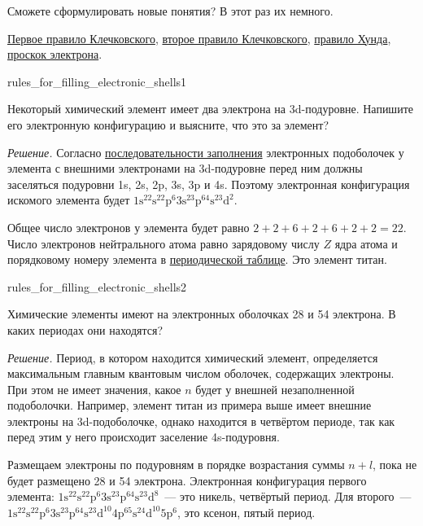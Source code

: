Сможете сформулировать новые понятия? В этот раз их немного.

\begin{termlist}
    \hyperref[term:Klechkovsky_first_rule]{Первое правило Клечковского},
    \hyperref[term:Klechkovsky_second_rule]{второе правило Клечковского},
    \hyperref[term:hund_rule]{правило Хунда},
    \hyperref[term:electron_slip]{проскок электрона}.
\end{termlist}

\begin{example}{}{rules_for_filling_electronic_shells1}
    \begin{condition}
        Некоторый химический элемент имеет два электрона на 3d-подуровне. Напишите его электронную конфигурацию и выясните, что это за элемент?
    \end{condition}

    \medskip

    \textit{Решение.} Согласно \hyperref[eq:sequence_of_filling_electronic_subshells]{последовательности заполнения} электронных подоболочек у элемента с внешними электронами на 3d-подуровне перед ним должны заселяться подуровни 1s, 2s, 2p, 3s, 3p и 4s. Поэтому электронная конфигурация искомого элемента будет $1\mathrm{s}^22\mathrm{s}^22\mathrm{p}^{6}3\mathrm{s}^23\mathrm{p}^64\mathrm{s}^23\mathrm{d}^2$.

    \medskip

    Общее число электронов у элемента будет равно $2 + 2 + 6 + 2 + 6 + 2 + 2 = 22$. Число электронов нейтрального атома равно зарядовому числу $Z$ ядра атома и порядковому номеру элемента в \hyperref[appendix:periodic_table]{периодической таблице}. Это элемент титан.
\end{example}

\begin{example}{}{rules_for_filling_electronic_shells2}
    \begin{condition}
        Химические элементы имеют на электронных оболочках 28 и 54 электрона. В каких периодах они находятся?
    \end{condition}

    \medskip

    \textit{Решение.} Период, в котором находится химический элемент, определяется максимальным главным квантовым числом оболочек, содержащих электроны. При этом не имеет значения, какое $n$ будет у внешней незаполненной подоболочки. Например, элемент титан из примера выше имеет внешние электроны на 3d-подоболочке, однако находится в четвёртом периоде, так как перед этим у него происходит заселение 4s-подуровня.

    \medskip

    Размещаем электроны по подуровням в порядке возрастания суммы $n + l$, пока не будет размещено 28 и 54 электрона. Электронная конфигурация первого элемента: $1\mathrm{s}^22\mathrm{s}^22\mathrm{p}^{6}3\mathrm{s}^23\mathrm{p}^64\mathrm{s}^23\mathrm{d}^8$~--- это никель, четвёртый период. Для второго~--- $1\mathrm{s}^22\mathrm{s}^22\mathrm{p}^{6}3\mathrm{s}^23\mathrm{p}^64\mathrm{s}^23\mathrm{d}^{10}4\mathrm{p}^65\mathrm{s}^24\mathrm{d}^{10}5\mathrm{p}^6$, это ксенон, пятый период.
\end{example}

